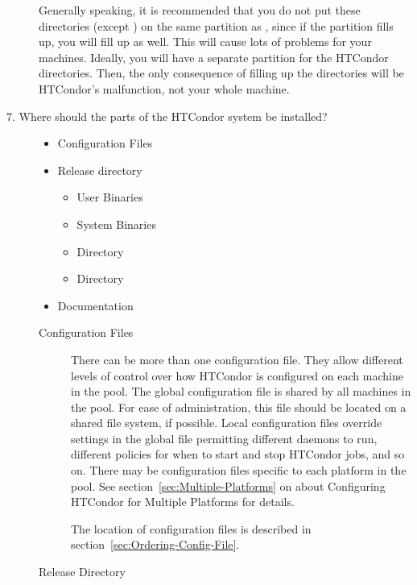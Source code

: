 \begin{description}
\begin{description}
\end{description}

Generally speaking, it is recommended that you do not put these directories
(except ) on the same partition as ,
since if the partition
fills up, you will fill up  as well. 
This will cause lots of
problems for your machines.  Ideally, you will have a separate partition
for the HTCondor directories. Then, the only consequence of filling up
the directories
will be HTCondor's malfunction, not your whole machine.

\item[7. Where should the parts of the HTCondor system be installed?]

	\begin{itemize}
	\item Configuration Files
	\item Release directory
		\begin{itemize}
		\item User Binaries
		\item System Binaries 
		\item {} Directory
	  	\item {} Directory
		\end{itemize}
	\item Documentation
	\end{itemize}

\label{sec:Config-File-Locations}
\begin{description}
\item[Configuration Files] There can be more than one configuration file.
They allow
different levels of control over how HTCondor is configured on each
machine in the pool.  
The global configuration file is shared by all machines in the pool.
For ease of administration, this file should be located on a shared
file system, if possible.
Local configuration files override settings in the
global file permitting different daemons to run,
different policies for when to start and stop HTCondor jobs, and so on.
There may be configuration files specific to each platform in the pool.
See section~\ref{sec:Multiple-Platforms} on about Configuring HTCondor for
Multiple Platforms for details.

The location of configuration files is described in
section~\ref{sec:Ordering-Config-File}.

\item[Release Directory]


\end{description}
\end{description}

